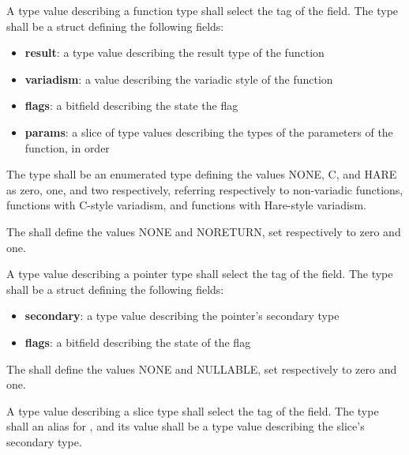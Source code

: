 
\specsubsubitem
A type value describing a function type shall select the  tag
of the  field. The  type shall be
a struct defining the following fields:

\begin{itemize}
\item \textbf{result}: a type value describing the result type of the function
\item \textbf{variadism}: a  value describing the variadic style of the function
\item \textbf{flags}: a  bitfield describing the state the  flag
\item \textbf{params}: a slice of type values describing the types of the parameters of the function, in order
\end{itemize}

\specsubsubitem
The  type shall be an enumerated type defining the
values NONE, C, and HARE as zero, one, and two respectively, referring
respectively to non-variadic functions, functions with C-style variadism, and
functions with Hare-style variadism.

\specsubsubitem
The  shall define the values NONE and NORETURN, set
respectively to zero and one.


\specsubsubitem
A type value describing a pointer type shall select the 
tag of the  field. The  type
shall be a struct defining the following fields:

\begin{itemize}
\item \textbf{secondary}: a type value describing the pointer's secondary type
\item \textbf{flags}: a  bitfield describing the state of the  flag
\end{itemize}

\specsubsubitem
The  shall define the values NONE and NULLABLE, set
respectively to zero and one.


\specsubsubitem
A type value describing a slice type shall select the  tag
of the  field. The  type
shall an alias for , and its value shall be a type value
describing the slice's secondary type.

